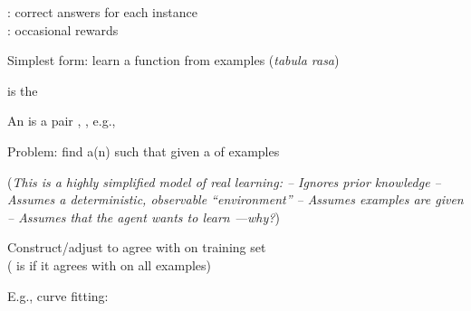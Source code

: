 \documentclass{article}
\begin{document}
\begin{huge}
\vspace*{0.1in}

\textwidth
{}

: correct answers for each instance\\
: occasional rewards




Simplest form: learn a function from examples (\emph{tabula rasa})

 is the 

An  is a pair , , e.g., 

Problem: find a(n)  \nl
   such that \nl
   given a  of examples

(\emph{This is a highly simplified model of real learning:\al
  -- Ignores prior knowledge\al
  -- Assumes a deterministic, observable ``environment''\al
  -- Assumes examples are \emph{given}\al
  -- Assumes that the agent \emph{wants} to learn ---why?})





Construct/adjust  to agree with  on training set\\
( is  if it agrees with  on all examples)

E.g., curve fitting:

\vspace*{0.2in}


\end{huge}
\end{document}
